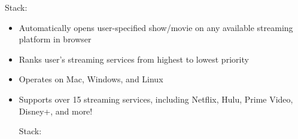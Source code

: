 \documentclass[10pt,a4paper,ragged2e,withhyper]{altacv}
\begin{document}
\begin{paracol}{2}
\begin{itemize}
    \smallskip
    Stack:

\end{itemize}

\divider

\begin{itemize}
    \item Automatically opens user-specified show/movie on any available streaming platform in browser
    \item Ranks user's streaming services from highest to lowest priority
    \item Operates on Mac, Windows, and Linux
    \item Supports over 15 streaming services, including Netflix, Hulu, Prime Video, Disney+, and more!

    \smallskip
    Stack:

\end{itemize}











\end{paracol}
\end{document}
